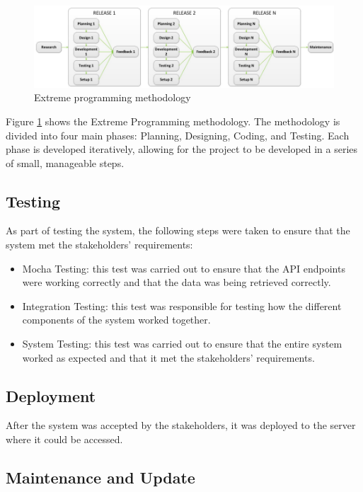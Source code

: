 \begin{figure}
    \centering
    \includegraphics[width=1.0\linewidth]{images/xp.png}
    \caption{Extreme programming methodology \cite{despa2014comparative}}
    \label{fig:agile}
\end{figure}

Figure \ref{fig:agile} shows the Extreme Programming methodology. The methodology is divided into four main phases: Planning, Designing, Coding, and Testing. 
Each phase is developed iteratively, allowing for the project to be developed in a series of small, manageable steps. 

\subsection{Testing}
As part of testing the system, the following steps were taken to ensure that the system met the stakeholders' requirements:

\begin{itemize}
    \item Mocha Testing: this test was carried out to ensure that the API endpoints were working correctly and that the data was being retrieved correctly.
    \item Integration Testing: this test was responsible for testing how the different components of the system worked together.
    \item System Testing: this test was carried out to ensure that the entire system worked as expected and that it met the stakeholders' requirements.
\end{itemize}
    

\subsection{Deployment}

After the system was accepted by the stakeholders, it was deployed to the server where it could be accessed. 

\subsection{Maintenance and Update}

